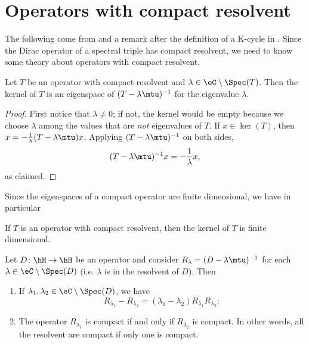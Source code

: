 \section{Operators with compact resolvent}

The following come from \cite{Whittaker} and a remark after the definition of a K-cycle in \cite{itoNCG_Varilly}. Since the Dirac operator of a spectral triple has compact resolvent, we need to know some theory about operators with compact resolvent.

\begin{lemma}		\label{LemResComKerFin}
	Let $T$ be an operator with compact resolvent and $\lambda\in\eC\setminus\Spec(T)$. Then the kernel of $T$ is an eigenspace of $(T-\lambda\mtu)^{-1}$ for the eigenvalue $\lambda$.
\end{lemma}

\begin{proof}
	First notice that $\lambda\neq 0$; if not, the kernel would be empty because we choose $\lambda$ among the values that are \emph{not} eigenvalues of $T$. If $x\in\ker(T)$, then $x=-\frac{1}{ \lambda }(T-\lambda\mtu)x$. Applying $(T-\lambda\mtu)^{-1}$ on both sides,
	\begin{equation}
		(T-\lambda\mtu)^{-1}x=-\frac{1}{ \lambda }x,
	\end{equation}
	as claimed.
\end{proof}

Since the eigenspaces of a compact operator are finite dimensional, we have in particular 
\begin{corollary}		\label{CorRezcomkerfin}
	If $T$ is an operator with compact resolvent, then the kernel of $T$ is finite dimensional.
\end{corollary}

\begin{lemma}		\label{LemResLcmpResLLcmp}
	Let $D\colon \hH\to \hH$ be an operator and consider $R_{\lambda}=(D-\lambda\mtu)^{-1}$ for each $\lambda\in\eC\setminus\Spec(D)$ (i.e. $\lambda$ is in the resolvent of $D$). Then
	\begin{enumerate}
		\item
			If $\lambda_1,\lambda_2\in\eC\setminus\Spec(D)$, we have
			\begin{equation}
				R_{\lambda_1}-R_{\lambda_2}=(\lambda_1-\lambda_2)R_{\lambda_1}R_{\lambda_2};
			\end{equation}
		\item
			The operator $R_{\lambda_1}$ is compact if and only if $R_{\lambda_2}$ is compact. In other words, all the resolvent are compact if only one is compact.
	\end{enumerate}
\end{lemma}

